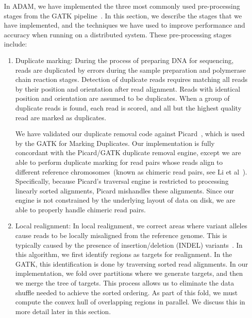 \documentclass[phd]{ucbthesis}
\begin{document}
In \textsc{ADAM}, we have implemented the three most commonly used pre-processing stages from the
\textsc{GATK} pipeline~\cite{depristo11}. In this section, we describe the stages that we have
implemented, and the techniques we have used to improve performance and accuracy when running on
a distributed system. These pre-processing stages include:

\begin{enumerate}
\item Duplicate marking: During the process of preparing DNA for sequencing, reads are duplicated by
errors during the sample preparation and polymerase chain reaction stages. Detection of duplicate reads
requires matching all reads by their position and orientation after read alignment. Reads with identical position
and orientation are assumed to be duplicates. When a group of duplicate reads is found, each read is scored,
and all but the highest quality read are marked as duplicates.

We have validated our duplicate removal code against Picard~\cite{picard}, which is used by the GATK
for Marking Duplicates. Our implementation is fully concordant with the Picard/GATK duplicate removal
engine, except we are able to perform duplicate marking for read pairs whose reads align to different
reference chromosomes~(known as chimeric read pairs, see Li et al~\cite{li10}).
Specifically, because Picard's traversal engine is restricted to processing linearly sorted alignments,
Picard mishandles these alignments. Since our engine is not constrained by the underlying layout of data
on disk, we are able to properly handle chimeric read pairs.
\item Local realignment: In local realignment, we correct areas where variant alleles cause reads to be
locally misaligned from the reference genome. This is typically caused by the presence of
insertion/deletion (INDEL) variants~\cite{depristo11}. In this algorithm, we first identify regions
as targets for realignment. In the \textsc{GATK}, this identification is done by traversing sorted read alignments. In our implementation,
we fold over partitions where we generate targets, and then we merge the tree of targets. This process allows us
to eliminate the data shuffle needed to achieve the sorted ordering. As part of this fold, we must
compute the convex hull of overlapping regions in parallel. We discuss this in more detail later in this section.


\end{enumerate}
\end{document}
